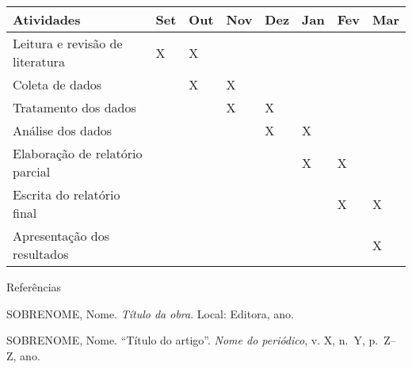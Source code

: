 \documentclass[
  letterpaper,
  DIV=11,
  numbers=noendperiod]{scrreprt}
\begin{document}
\begin{longtable}[]{@{}
  >{\raggedright\arraybackslash}p{}
  >{\centering\arraybackslash}p{}
  >{\centering\arraybackslash}p{}
  >{\centering\arraybackslash}p{}
  >{\centering\arraybackslash}p{}
  >{\centering\arraybackslash}p{}
  >{\centering\arraybackslash}p{}
  >{\centering\arraybackslash}p{}@{}}
\toprule\noalign{}
\begin{minipage}[b]{\linewidth}\raggedright
Atividades
\end{minipage} & \begin{minipage}[b]{\linewidth}\centering
Set
\end{minipage} & \begin{minipage}[b]{\linewidth}\centering
Out
\end{minipage} & \begin{minipage}[b]{\linewidth}\centering
Nov
\end{minipage} & \begin{minipage}[b]{\linewidth}\centering
Dez
\end{minipage} & \begin{minipage}[b]{\linewidth}\centering
Jan
\end{minipage} & \begin{minipage}[b]{\linewidth}\centering
Fev
\end{minipage} & \begin{minipage}[b]{\linewidth}\centering
Mar
\end{minipage} \\
\midrule\noalign{}
\endhead
\bottomrule\noalign{}
\endlastfoot
Leitura e revisão de literatura & X & X & & & & & \\
Coleta de dados & & X & X & & & & \\
Tratamento dos dados & & & X & X & & & \\
Análise dos dados & & & & X & X & & \\
Elaboração de relatório parcial & & & & & X & X & \\
Escrita do relatório final & & & & & & X & X \\
Apresentação dos resultados & & & & & & & X \\
\end{longtable}

Referências

SOBRENOME, Nome. \emph{Título da obra}. Local: Editora, ano.

SOBRENOME, Nome. ``Título do artigo''. \emph{Nome do periódico}, v. X,
n.~Y, p.~Z--Z, ano.
\end{document}
